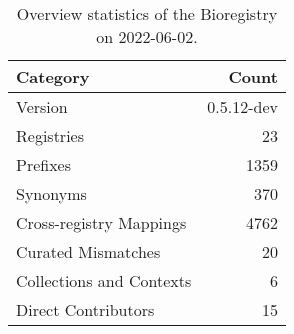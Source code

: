 \begin{table}
\centering
\caption{Overview statistics of the Bioregistry on 2022-06-02.}
\label{tab:bioregistry-summary}
\begin{tabular}{lr}
\toprule
                Category &      Count \\
\midrule
                 Version & 0.5.12-dev \\
              Registries &         23 \\
                Prefixes &       1359 \\
                Synonyms &        370 \\
 Cross-registry Mappings &       4762 \\
      Curated Mismatches &         20 \\
Collections and Contexts &          6 \\
     Direct Contributors &         15 \\
\bottomrule
\end{tabular}
\end{table}

